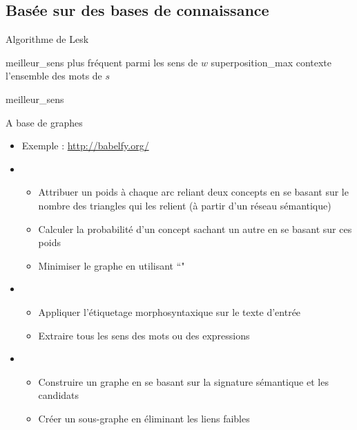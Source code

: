 \documentclass{KodeBook}
\begin{document}
\subsection{Basée sur des bases de connaissance}

\begin{block}{Algorithme de Lesk}
	\footnotesize\vspace{-3pt}
	\begin{algorithm}[H]
		
		meilleur\_sens \textleftarrow plus fréquent parmi les sens de $w$\;
		superposition\_max \;
		contexte \textleftarrow l'ensemble des mots de $s$\; 
		
		
		\Retour meilleur\_sens \;
		\vspace{-3pt}
	\end{algorithm}
\end{block}

 A base de graphes
 
\begin{itemize}
	\item Exemple : \url{http://babelfy.org/} \cite{2014-moro-al}
	\item {}
	\begin{itemize}
		\item Attribuer un poids à chaque arc reliant deux concepts en se basant sur le nombre des triangles qui les relient (à partir d'un réseau sémantique)
		\item Calculer la probabilité d'un concept sachant un autre en se basant sur ces poids
		\item Minimiser le graphe en utilisant ``"
	\end{itemize}
	\item {}
	\begin{itemize}
		\item Appliquer l'étiquetage morphosyntaxique sur le texte d'entrée
		\item Extraire tous les sens des mots ou des expressions
	\end{itemize}
	\item {}
	\begin{itemize}
		\item Construire un graphe en se basant sur la signature sémantique et les candidats
		\item Créer un sous-graphe en éliminant les liens faibles
	\end{itemize}
\end{itemize}
\end{document}
